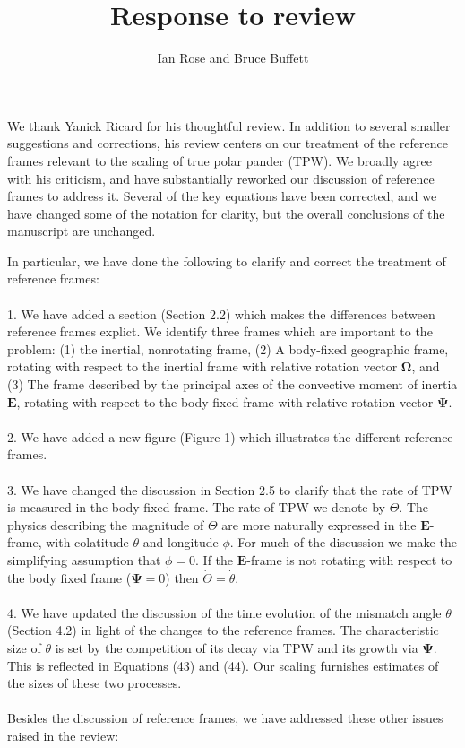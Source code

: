 \documentclass[a4paper,12pt]{article}
\title{Response to review}
\author{Ian Rose and Bruce Buffett}
\date{}
\begin{document}
\maketitle

We thank Yanick Ricard for his thoughtful review.
In addition to several smaller suggestions and corrections,
his review centers on our treatment of the reference frames relevant to the scaling of true polar pander (TPW).
We broadly agree with his criticism, and have substantially reworked our discussion of reference frames to address it.
Several of the key equations have been corrected, and we have changed some of the notation for clarity,
but the overall conclusions of the manuscript are unchanged.

In particular, we have done the following to clarify and correct the treatment of reference frames:
\\
\\
1. We have added a section (Section 2.2) which makes the differences between reference frames explict.
We identify three frames which are important to the problem: 
(1) the inertial, nonrotating frame, 
(2) A body-fixed geographic frame, rotating with respect to the inertial frame with relative rotation vector $\mathbf{\Omega}$, and
(3) The frame described by the principal axes of the convective moment of inertia $\mathbf{E}$,
rotating with respect to the body-fixed frame with relative rotation vector $\mathbf{\Psi}$.
\\
\\
2. We have added a new figure (Figure 1) which illustrates the different reference frames.
\\
\\
3. We have changed the discussion in Section 2.5 to clarify that the rate of TPW is measured in the body-fixed frame.
The rate of TPW we denote by $\dot{\Theta}$. The physics describing the magnitude of $\dot{\Theta}$ are 
more naturally expressed in the $\mathbf{E}$-frame, with colatitude $\theta$ and longitude $\phi$. 
For much of the discussion we make the simplifying assumption that $\phi=0$.
If the $\mathbf{E}$-frame is not rotating with respect to the body fixed frame ($\mathbf{\Psi}=0$) then $\dot{\Theta} = \dot{\theta}$.
\\
\\
4. We have updated the discussion of the time evolution of the mismatch angle $\theta$ (Section 4.2)
in light of the changes to the reference frames. The characteristic size of $\theta$ is set by 
the competition of its decay via TPW and its growth via $\mathbf{\Psi}$.
This is reflected in Equations (43) and (44).
Our scaling furnishes estimates of the sizes of these two processes.
\\
\\
Besides the discussion of reference frames, we have addressed these other issues raised in the review:
\end{document}
